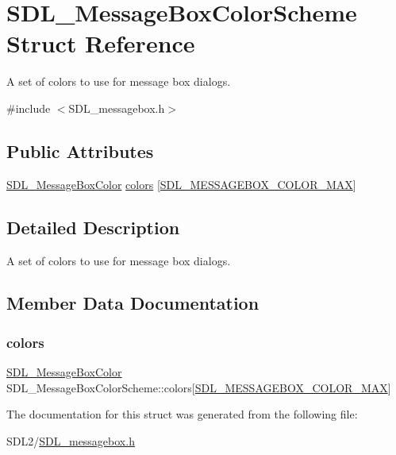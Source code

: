 \hypertarget{struct_s_d_l___message_box_color_scheme}{}\section{S\+D\+L\+\_\+\+Message\+Box\+Color\+Scheme Struct Reference}
\label{struct_s_d_l___message_box_color_scheme}


A set of colors to use for message box dialogs.  




{\ttfamily \#include $<$S\+D\+L\+\_\+messagebox.\+h$>$}

\subsection*{Public Attributes}
\begin{DoxyCompactItemize}
\item 
\hyperlink{struct_s_d_l___message_box_color}{S\+D\+L\+\_\+\+Message\+Box\+Color} \hyperlink{struct_s_d_l___message_box_color_scheme_ae3712ec81e41b63b781b7d49d3b3b8f6}{colors} \mbox{[}\hyperlink{_s_d_l__messagebox_8h_a75e562d38bc214725e01f4f829bc1567a0a575b056603e38e844b141c83a44d89}{S\+D\+L\+\_\+\+M\+E\+S\+S\+A\+G\+E\+B\+O\+X\+\_\+\+C\+O\+L\+O\+R\+\_\+\+M\+AX}\mbox{]}
\end{DoxyCompactItemize}


\subsection{Detailed Description}
A set of colors to use for message box dialogs. 

\subsection{Member Data Documentation}
\mbox{\label{struct_s_d_l___message_box_color_scheme_ae3712ec81e41b63b781b7d49d3b3b8f6}} 
\subsubsection{\texorpdfstring{colors}{colors}}
{\footnotesize\ttfamily \hyperlink{struct_s_d_l___message_box_color}{S\+D\+L\+\_\+\+Message\+Box\+Color} S\+D\+L\+\_\+\+Message\+Box\+Color\+Scheme\+::colors\mbox{[}\hyperlink{_s_d_l__messagebox_8h_a75e562d38bc214725e01f4f829bc1567a0a575b056603e38e844b141c83a44d89}{S\+D\+L\+\_\+\+M\+E\+S\+S\+A\+G\+E\+B\+O\+X\+\_\+\+C\+O\+L\+O\+R\+\_\+\+M\+AX}\mbox{]}}



The documentation for this struct was generated from the following file\+:\begin{DoxyCompactItemize}
\item 
S\+D\+L2/\hyperlink{_s_d_l__messagebox_8h}{S\+D\+L\+\_\+messagebox.\+h}\end{DoxyCompactItemize}

